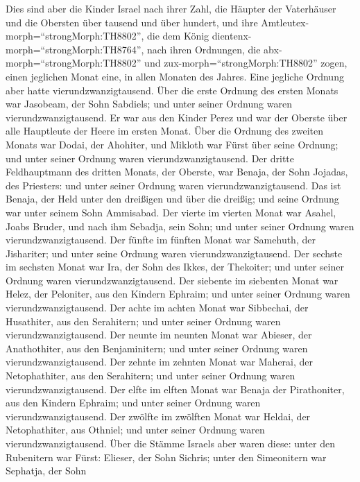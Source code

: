  Dies sind aber die Kinder Israel nach ihrer Zahl, die
Häupter der Vaterhäuser und die Obersten über tausend und über hundert,
und ihre Amtleutex-morph=``strongMorph:TH8802'', die dem König
dientenx-morph=``strongMorph:TH8764'', nach ihren Ordnungen, die
abx-morph=``strongMorph:TH8802'' und zux-morph=``strongMorph:TH8802''
zogen, einen jeglichen Monat eine, in allen Monaten des Jahres. Eine
jegliche Ordnung aber hatte vierundzwanzigtausend.  Über die
erste Ordnung des ersten Monats war Jasobeam, der Sohn Sabdiels; und
unter seiner Ordnung waren vierundzwanzigtausend.  Er war
aus den Kinder Perez und war der Oberste über alle Hauptleute der Heere
im ersten Monat.  Über die Ordnung des zweiten Monats war
Dodai, der Ahohiter, und Mikloth war Fürst über seine Ordnung; und unter
seiner Ordnung waren vierundzwanzigtausend.  Der dritte
Feldhauptmann des dritten Monats, der Oberste, war Benaja, der Sohn
Jojadas, des Priesters: und unter seiner Ordnung waren
vierundzwanzigtausend.  Das ist Benaja, der Held unter den
dreißigen und über die dreißig; und seine Ordnung war unter seinem Sohn
Ammisabad.  Der vierte im vierten Monat war Asahel, Joabs
Bruder, und nach ihm Sebadja, sein Sohn; und unter seiner Ordnung waren
vierundzwanzigtausend.  Der fünfte im fünften Monat war
Samehuth, der Jishariter; und unter seine Ordnung waren
vierundzwanzigtausend.  Der sechste im sechsten Monat war
Ira, der Sohn des Ikkes, der Thekoiter; und unter seiner Ordnung waren
vierundzwanzigtausend.  Der siebente im siebenten Monat war
Helez, der Peloniter, aus den Kindern Ephraim; und unter seiner Ordnung
waren vierundzwanzigtausend.  Der achte im achten Monat war
Sibbechai, der Husathiter, aus den Serahitern; und unter seiner Ordnung
waren vierundzwanzigtausend.  Der neunte im neunten Monat
war Abieser, der Anathothiter, aus den Benjaminitern; und unter seiner
Ordnung waren vierundzwanzigtausend.  Der zehnte im zehnten
Monat war Maherai, der Netophathiter, aus den Serahitern; und unter
seiner Ordnung waren vierundzwanzigtausend.  Der elfte im
elften Monat war Benaja der Pirathoniter, aus den Kindern Ephraim; und
unter seiner Ordnung waren vierundzwanzigtausend.  Der
zwölfte im zwölften Monat war Heldai, der Netophathiter, aus Othniel;
und unter seiner Ordnung waren vierundzwanzigtausend.  Über
die Stämme Israels aber waren diese: unter den Rubenitern war Fürst:
Elieser, der Sohn Sichris; unter den Simeonitern war Sephatja, der Sohn
